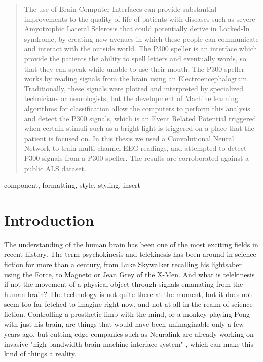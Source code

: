 \documentclass[conference]{IEEEtran}
\begin{document}
\begin{abstract}
The use of Brain-Computer Interfaces can provide substantial improvements to the quality of life of patients with diseases such as severe Amyotrophic Lateral Sclerosis that could potentially derive in Locked-In syndrome, by creating new avenues in which these people can communicate and interact with the outside world. The P300 speller is an interface which provide the patients the ability to spell letters and eventually words, so that they can speak while unable to use their mouth. The P300 speller works by reading signals from the brain using an Electroencephalogram. Traditionally, these signals were plotted and interpreted by specialized technicians or neurologists, but the development of Machine learning algorithms for classification allow the computers to perform this analysis and detect the P300 signals, which is an Event Related Potential triggered when certain stimuli such as a bright light is triggered on a place that the patient is focused on. In this thesis we used a Convolutional Neural Network to train multi-channel EEG readings, and attempted to detect P300 signals from a P300 speller. The results are corroborated against a public ALS dataset.
\end{abstract}

\begin{IEEEkeywords}
component, formatting, style, styling, insert
\end{IEEEkeywords}

\section{Introduction}
\label{intro}

The understanding of the human brain has been one of the most exciting fields in recent history. The term psychokinesis and telekinesis has been around in science fiction for more than a century, from Luke Skywalker recalling his lightsaber using the Force, to Magneto  or Jean Grey of the X-Men. And what is telekinesis if not the movement of a physical object through signals emanating from the human brain?\cite{bcianiversary:10.1080/00051144.2019.1570644} The technology is not quite there at the moment, but it does not seem too far fetched to imagine right now, and not at all in the realm of science fiction. Controlling a prosthetic limb with the mind, or a monkey playing Pong\cite{neuralinkpong} with just his brain, are things that would have been unimaginable only a few years ago, but  cutting edge companies such as Neuralink are already working on invasive "high-bandwidth brain-machine interface system" \cite{info:neuralink/10.2196/16194}, which can make this kind of things a reality.
\end{document}
